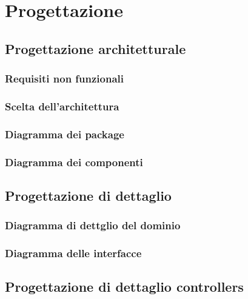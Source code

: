 \documentclass{article}
\begin{document}
\section{Progettazione}

\subsection{Progettazione architetturale}
\subsubsection{Requisiti non funzionali}

\subsubsection{Scelta dell'architettura}

\subsubsection{Diagramma dei package}

\subsubsection{Diagramma dei componenti}


\subsection{Progettazione di dettaglio}
\subsubsection{Diagramma di dettglio del dominio}

\subsubsection{Diagramma delle interfacce}


\subsection{Progettazione di dettaglio controllers}
\end{document}
